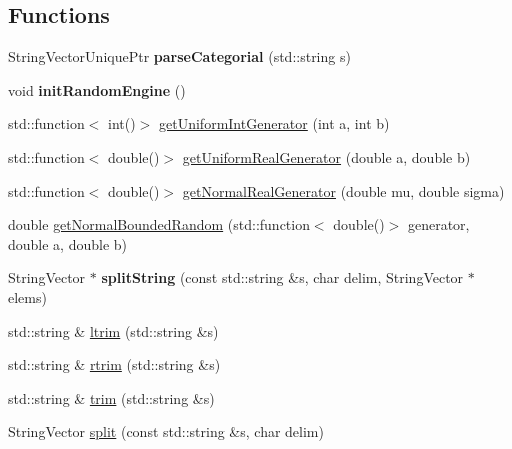 \subsection*{Functions}
\begin{DoxyCompactItemize}
\item 
\hypertarget{namespaceffactory_afa91af98e3a5ec4bb71e9d0d25c14db8}{String\-Vector\-Unique\-Ptr {\bfseries parse\-Categorial} (std\-::string s)}\label{namespaceffactory_afa91af98e3a5ec4bb71e9d0d25c14db8}

\item 
\hypertarget{namespaceffactory_aaeb9076f2872a2c9f7e0d7f35d718432}{void {\bfseries init\-Random\-Engine} ()}\label{namespaceffactory_aaeb9076f2872a2c9f7e0d7f35d718432}

\item 
std\-::function$<$ int()$>$ \hyperlink{namespaceffactory_a6fe18f1d0eb91c313c254ca72beb1412}{get\-Uniform\-Int\-Generator} (int a, int b)
\item 
std\-::function$<$ double()$>$ \hyperlink{namespaceffactory_aa69d3e53f7d0abc44bd78a4ad1afe6ce}{get\-Uniform\-Real\-Generator} (double a, double b)
\item 
std\-::function$<$ double()$>$ \hyperlink{namespaceffactory_aee18b45d7a86acf213551949186406f3}{get\-Normal\-Real\-Generator} (double mu, double sigma)
\item 
double \hyperlink{namespaceffactory_aae55cf7f79af40989ce638addebd4627}{get\-Normal\-Bounded\-Random} (std\-::function$<$ double()$>$ generator, double a, double b)
\item 
\hypertarget{namespaceffactory_a6ecf2c6f4b4333996f7b25e3bd2da055}{String\-Vector $\ast$ {\bfseries split\-String} (const std\-::string \&s, char delim, String\-Vector $\ast$elems)}\label{namespaceffactory_a6ecf2c6f4b4333996f7b25e3bd2da055}

\item 
std\-::string \& \hyperlink{namespaceffactory_a5aa5a805c9fc853666f52e9186e2b1c1}{ltrim} (std\-::string \&s)
\item 
std\-::string \& \hyperlink{namespaceffactory_a86fd2d5b590cf9f27ea06552e8db9afc}{rtrim} (std\-::string \&s)
\item 
std\-::string \& \hyperlink{namespaceffactory_ae9b56bfc728d75a1745e49de5925ddf5}{trim} (std\-::string \&s)
\item 
String\-Vector \hyperlink{namespaceffactory_a1fec00d28dbea621e480fd9f221d972e}{split} (const std\-::string \&s, char delim)
\end{DoxyCompactItemize}


